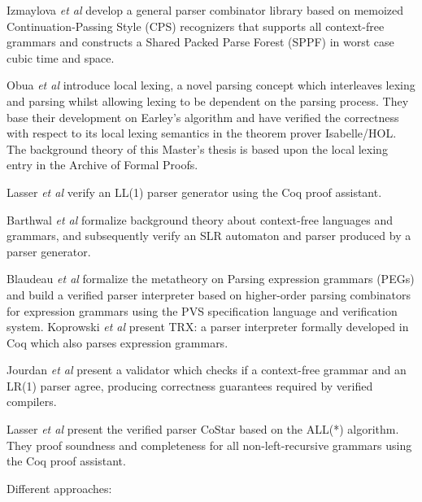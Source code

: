 \begin{isabellebody}
\begin{isamarkuptext}
Izmaylova \textit{et al} \cite{Izmaylova:2016} develop a general parser 
combinator library based on memoized Continuation-Passing Style (CPS) recognizers that supports all
context-free grammars and constructs a Shared Packed Parse Forest (SPPF) in worst case cubic time and space.%
\end{isamarkuptext}\isamarkuptrue%
%
\isadelimdocument
%
\endisadelimdocument
%
\isatagdocument
%
\isamarkuptrue%
%
\endisatagdocument
{\isafolddocument}%
%
\isadelimdocument
%
\endisadelimdocument
%
\begin{isamarkuptext}%
Obua \textit{et al} \cite{Obua:2017} introduce local lexing, a novel parsing concept which interleaves
lexing and parsing whilst allowing lexing to be dependent on the parsing process. They base their
development on Earley's algorithm and have verified the correctness with respect to its local lexing
semantics in the theorem prover Isabelle/HOL. The background theory of this Master's thesis is based
upon the local lexing entry \cite{LocalLexing-AFP} in the Archive of Formal Proofs.

Lasser \textit{et al} \cite{Lasser:2019} verify an LL(1) parser generator using the Coq proof assistant.

Barthwal \textit{et al} \cite{Barthwal:2009} formalize background theory
about context-free languages and grammars, and subsequently verify an SLR automaton and parser produced
by a parser generator.

Blaudeau \textit{et al} \cite{Blaudeau:2020} formalize the metatheory on Parsing expression grammars (PEGs) and
build a verified parser interpreter based on higher-order parsing combinators for expression grammars
using the PVS specification language and verification system. Koprowski \textit{et al} \cite{Koprowski:2011}
present TRX: a parser interpreter formally developed in Coq which also parses expression grammars.

Jourdan \textit{et al} \cite{Jourdan:2012} present a validator which checks if a context-free grammar
and an LR(1) parser agree, producing correctness guarantees required by verified compilers.

Lasser \textit{et al} \cite{Lasser:2021} present the verified parser CoStar based on the ALL(*) algorithm.
They proof soundness and completeness for all non-left-recursive grammars using the Coq proof assistant.%
\end{isamarkuptext}\isamarkuptrue%
%
\isadelimdocument
%
\endisadelimdocument
%
\isatagdocument
%
\isamarkuptrue%
%
\endisatagdocument
{\isafolddocument}%
%
\isadelimdocument
%
\endisadelimdocument
%
\begin{isamarkuptext}%
Different approaches:


\end{isamarkuptext}
\end{isabellebody}
